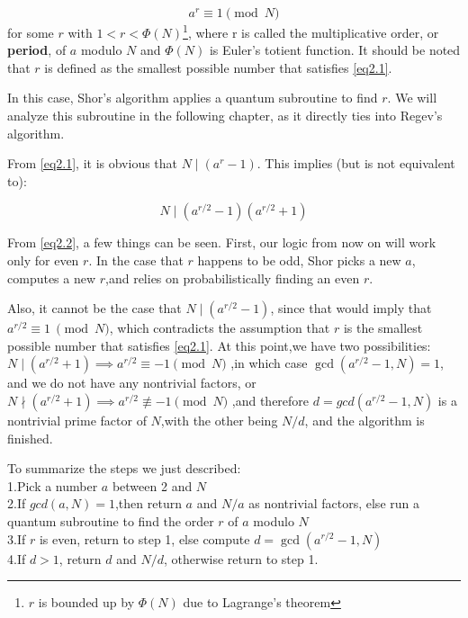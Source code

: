 \begin{equation}
a^r \equiv 1 \pmod N
\label{eq2.1}
\end{equation}
for some $r$ with $1<r<\Phi(N)$\footnote{$r$ is bounded up by $\Phi(N)$ due to Lagrange's theorem}, where r is called the multiplicative order, or \textbf{period}, of $a$ modulo $N$ and $\Phi(N)$ is Euler's totient function. It should be noted that $r$ is defined as the smallest possible number that satisfies \eqref{eq2.1}.

In this case, Shor's algorithm applies a quantum subroutine to find $r$. We will analyze this subroutine in the following chapter, as it directly ties into Regev's algorithm.

From \eqref{eq2.1}, it is obvious that  $N\mid(a^r - 1)$. This implies (but is not equivalent to):

\begin{equation}
N\mid(a^{r/2} - 1)(a^{r/2} + 1)
\label{eq2.2}
\end{equation}

From \eqref{eq2.2}, a few things can be seen. First, our logic from now on will work only for even $r$. In the case that $r$ happens to be odd, Shor picks a new $a$, computes a new $r$,and relies on probabilistically finding an even $r$.


Also, it cannot be the case that $N\mid(a^{r/2} - 1)$, since that would imply that $a^{r/2} \equiv 1\: \pmod N$, which contradicts the assumption that $r$ is the smallest possible number that satisfies \eqref{eq2.1}. At this point,we have two possibilities: $N\mid(a^{r/2} + 1)\implies a^{r/2} \equiv -1 \pmod N$ ,in which case $\gcd(a^{r/2} -1,N) = 1$, and we do not have any nontrivial factors, or $N\nmid(a^{r/2} + 1)\implies a^{r/2} \not\equiv -1 \pmod N$ ,and therefore $d = gcd(a^{r/2} -1,N)$ is a nontrivial prime factor of $N$,with the other being $N/d$, and the algorithm is finished.

To summarize the steps we just described:\\
1.Pick a number $a$ between 2 and $N$\\
2.If $gcd(a,N) = 1$,then return $a$ and $N/a$ as nontrivial factors, else run a quantum subroutine to find the order $r$ of $a$ modulo $N$\\
3.If $r$ is even, return to step 1, else compute $d = \gcd(a^{r/2} -1,N)$\\
4.If $d > 1$, return $d$ and $N/d$, otherwise return to step 1.\\










